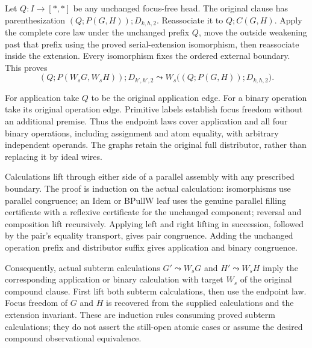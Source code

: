 Let $Q:I\to[*,*]$ be any unchanged focus-free head. The original clause has
parenthesization $(Q;P(G,H));D_{k,h,2}$. Reassociate it to $Q;C(G,H)$.
Apply the complete core law under the unchanged prefix $Q$, move the
outside weakening past that prefix using the proved serial-extension
isomorphism, then reassociate inside the extension. Every isomorphism fixes
the ordered external boundary. This proves
\[
 (Q;P(W_sG,W_sH));D_{k',h',2}
 \leadsto W_s\bigl((Q;P(G,H));D_{k,h,2}\bigr).
\]

For application take $Q$ to be the original application edge. For a binary
operation take its original operation edge. Primitive labels establish
focus freedom without an additional premise. Thus the endpoint laws cover
application and all four binary operations, including assignment and atom
equality, with arbitrary independent operands. The graphs retain the
original full distributor, rather than replacing it by ideal wires.

Calculations lift through either side of a parallel assembly with any
prescribed boundary. The proof is induction on the actual calculation:
isomorphisms use parallel congruence; an Idem or BPullW leaf uses the genuine
parallel filling certificate with a reflexive certificate for the unchanged
component; reversal and composition lift recursively. Applying left and
right lifting in succession, followed by the pair's equality transport,
gives pair congruence. Adding the unchanged operation prefix and distributor
suffix gives application and binary congruence.

Consequently, actual subterm calculations $G'\leadsto W_sG$ and
$H'\leadsto W_sH$ imply the corresponding application or binary calculation
with target $W_s$ of the original compound clause. First lift both subterm
calculations, then use the endpoint law. Focus freedom of $G$ and $H$ is
recovered from the supplied calculations and the extension invariant.
These are induction rules consuming proved subterm calculations; they do
not assert the still-open atomic cases or assume the desired compound
observational equivalence.

